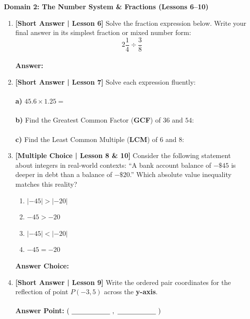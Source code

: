 \documentclass[12pt, letterpaper, fleqn]{article}
\newcommand{\blankshorter}{\underline{\hspace{2.0cm}}}
\newcommand{\blanklong}{\underline{\hspace{6.5cm}}}
\begin{document}
\begin{tcolorbox}[colback=white, colframe=black, arc=2mm]
    \textbf{Domain 2: The Number System \& Fractions (Lessons 6--10)}
\end{tcolorbox}

\begin{enumerate}[leftmargin=0.6cm, itemsep=1.2cm, start=5]

\item \textbf{[Short Answer | Lesson 6]} Solve the fraction expression below. Write your final answer in its simplest fraction or mixed number form:
$$2\frac{1}{4} \div \frac{3}{8}$$
\vspace{1.5cm} \\
\textbf{Answer:} \blanklong

\item \textbf{[Short Answer | Lesson 7]} Solve each expression fluently:
\\ \\
\textbf{a)} $45.6 \times 1.25 =$ \blanklong \\ \\
\textbf{b)} Find the Greatest Common Factor (\textbf{GCF}) of $36$ and $54$: \blankshorter \\ \\
\textbf{c)} Find the Least Common Multiple (\textbf{LCM}) of $6$ and $8$: \blankshorter

\item \textbf{[Multiple Choice | Lesson 8 \& 10]} Consider the following statement about integers in real-world contexts: ``A bank account balance of $-\$45$ is deeper in debt than a balance of $-\$20$.'' Which absolute value inequality matches this reality?
\begin{enumerate}[label=\Alph*)]
    \item $|-45| > |-20|$
    \item $-45 > -20$
    \item $|-45| < |-20|$
    \item $-45 = -20$
\end{enumerate}
\textbf{Answer Choice:} \blankshorter

\item \textbf{[Short Answer | Lesson 9]} Write the ordered pair coordinates for the reflection of point $P(-3, 5)$ across the \textbf{y-axis}.
\\ \\
\textbf{Answer Point:} $(\ \blankshorter\ , \ \blankshorter\ )$

\end{enumerate}
\end{document}
